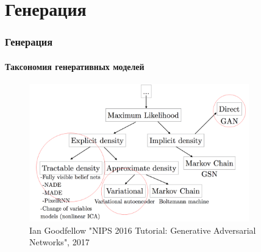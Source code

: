 \documentclass[10pt]{beamer}
\begin{document}
\section{Генерация}
\begin{frame}
\frametitle{Генерация}
\framesubtitle{Таксономия генеративных моделей}


\begin{figure}[H]
\centering
\includegraphics[width=0.85\textwidth]{images/gen_taxonomy2.png}
\caption*{Ian Goodfellow "NIPS 2016 Tutorial: Generative Adversarial Networks", 2017}
\end{figure}

\end{frame}
\end{document}
